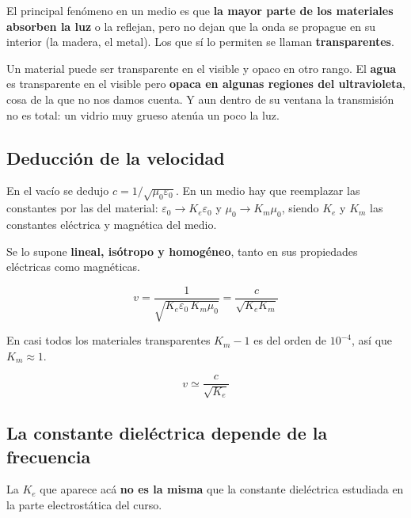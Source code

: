 \documentclass[12pt,a4paper]{article}
\begin{document}
El principal fenómeno en un medio es que \textbf{la mayor parte de los materiales
absorben la luz} o la reflejan, pero no dejan que la onda se propague en su
interior (la madera, el metal). Los que sí lo permiten se llaman
\textbf{transparentes}.

\begin{notebox}
Un material puede ser transparente en el visible y opaco en otro rango. El
\textbf{agua} es transparente en el visible pero \textbf{opaca en algunas regiones
del ultravioleta}, cosa de la que no nos damos cuenta. Y aun dentro de su ventana
la transmisión no es total: un vidrio muy grueso atenúa un poco la luz.
\end{notebox}

\subsection{Deducción de la velocidad}

En el vacío se dedujo $c = 1/\sqrt{\mu_0\varepsilon_0}$. En un medio hay que
reemplazar las constantes por las del material:
$\varepsilon_0 \to K_e\varepsilon_0$ y $\mu_0 \to K_m\mu_0$, siendo $K_e$ y $K_m$
las constantes eléctrica y magnética del medio.

\begin{notebox}
Se lo supone \textbf{lineal, isótropo y homogéneo}, tanto en sus propiedades
eléctricas como magnéticas.
\end{notebox}

\[
v = \frac{1}{\sqrt{K_e\varepsilon_0\, K_m\mu_0}} = \frac{c}{\sqrt{K_e K_m}}
\]

\begin{notebox}
En casi todos los materiales transparentes $K_m - 1$ es del orden de $10^{-4}$,
así que $K_m \approx 1$.
\end{notebox}

\begin{keybox}
\[
\boxed{\ v \simeq \frac{c}{\sqrt{K_e}}\ }
\]
\end{keybox}

\subsection{La constante dieléctrica depende de la frecuencia}

\begin{warnbox}
La $K_e$ que aparece acá \textbf{no es la misma} que la constante dieléctrica
estudiada en la parte electrostática del curso.
\end{warnbox}
\end{document}

